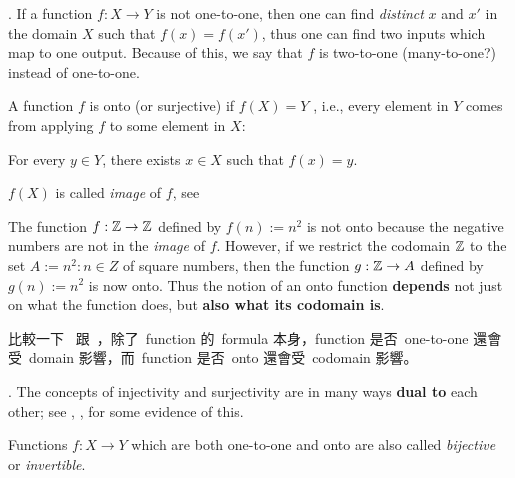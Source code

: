 \begin{remark} \label{remark 3.3.16}.
If a function \(f : X \rightarrow Y\) is not one-to-one, then one can find \emph{distinct} \(x\) and \(x'\) in the domain \(X\) such that \(f(x)= f(x')\),
thus one can find two inputs which map to one output. Because of this, we say that \(f\) is two-to-one (many-to-one?) instead of one-to-one.
\end{remark}

\begin{definition}  \label{def 3.3.17}
A function \(f\) is onto (or surjective) if \(f(X) = Y\) , i.e., every element in \(Y\) comes from applying \(f\) to some element in \(X\):
\begin{center}
    For every \(y \in Y\), there exists \(x \in X\) such that \(f(x) = y\).    
\end{center}
 \(f(X)\) is called \emph{image} of \(f\), see 
\end{definition}

\begin{example} [Informal] \label{example 3.3.18}
The function \(f : \mathbb{Z} \rightarrow \mathbb{Z}\) defined by \(f(n) := n^2\) is not onto because the negative numbers are not in the \emph{image} of \(f\).
However, if we restrict the codomain \(\mathbb{Z}\) to the set \(A := {n^2 : n \in Z}\) of square numbers, then the function \(g : \mathbb{Z} \rightarrow A\) defined by \(g(n) := n^2\) is now onto.
Thus the notion of an onto function \textbf{depends} not just on what the function does, but \textbf{also what its codomain is}.
\end{example}

\begin{note}
比較一下\  跟\ ，除了\ function 的\ formula 本身，function 是否\ one-to-one 還會受\ domain 影響，而\ function 是否\ onto 還會受\ codomain 影響。
\end{note}

\begin{remark} \label{remark 3.3.19}.
The concepts of injectivity and surjectivity are in many ways \textbf{dual to} each other; see , ,  for some evidence of this.
\end{remark}

\begin{definition}  \label{def 3.3.20}
Functions \(f : X \rightarrow Y\) which are both one-to-one and onto are also called \emph{bijective} or \emph{invertible}.
\end{definition}

